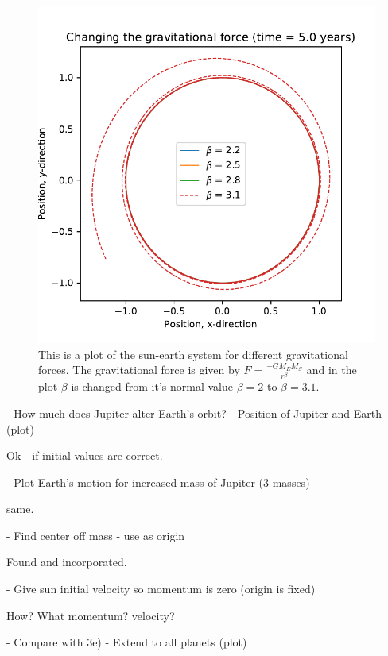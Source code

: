 \begin{figure}[H]
\includegraphics[width=1.1\linewidth]{../results/plots/diffenrent_gravitation.pdf}\caption{This is a plot of the sun-earth system for different gravitational forces. The gravitational force is given by $ F = \frac{-GM_EM_S}{r^\beta}$ and in the plot $\beta$ is changed from it's normal value $\beta = 2$ to $\beta = 3.1$.}\label{fig:different_gravitation}
\end{figure}

	- How much does Jupiter alter Earth's orbit?
	- Position of Jupiter and Earth (plot)	

	Ok - if initial values are correct.
	
	- Plot Earth's motion for increased mass of Jupiter (3 masses)

	same.	
	
	- Find center off mass - use as origin

	Found and incorporated.	
	
	- Give sun initial velocity so momentum is zero (origin is fixed)

	How? What momentum? velocity?	
	
	- Compare with 3e)
	- Extend to all planets (plot)
	
